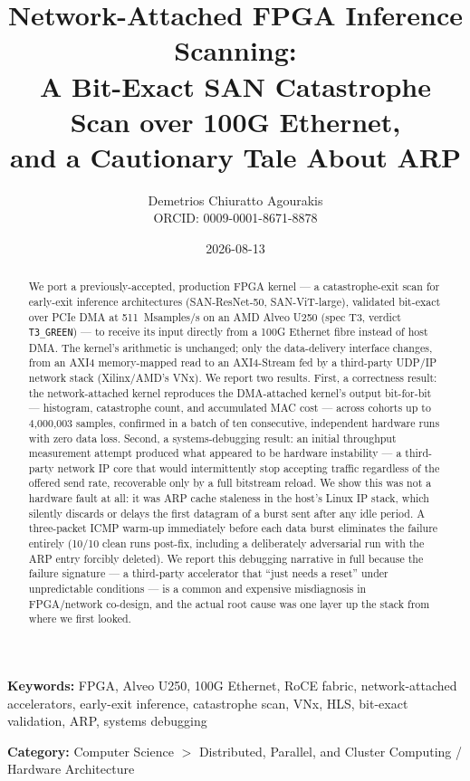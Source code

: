 \documentclass[11pt,a4paper]{article}
\title{\Large Network-Attached FPGA Inference Scanning: \\[4pt]
  A Bit-Exact SAN Catastrophe Scan over 100G Ethernet, \\[4pt]
  and a Cautionary Tale About ARP}
\author{
  Demetrios Chiuratto Agourakis\\
  \small ORCID: 0009-0001-8671-8878
}
\date{2026-08-13}
\newcommand{\code}[1]{\texttt{#1}}
\begin{document}
\maketitle

\begin{abstract}
We port a previously-accepted, production FPGA kernel --- a
catastrophe-exit scan for early-exit inference architectures
(SAN-ResNet-50, SAN-ViT-large), validated bit-exact over PCIe DMA at
511~Msamples/s on an AMD Alveo U250 (spec T3, verdict \code{T3\_GREEN})
--- to receive its input directly from a 100G Ethernet fibre instead of
host DMA. The kernel's arithmetic is unchanged; only the data-delivery
interface changes, from an AXI4 memory-mapped read to an AXI4-Stream fed
by a third-party UDP/IP network stack (Xilinx/AMD's VNx). We report two
results. First, a correctness result: the network-attached kernel
reproduces the DMA-attached kernel's output bit-for-bit --- histogram,
catastrophe count, and accumulated MAC cost --- across cohorts up to
4{,}000{,}003 samples, confirmed in a batch of ten consecutive,
independent hardware runs with zero data loss. Second, a
systems-debugging result: an initial throughput measurement attempt
produced what appeared to be hardware instability --- a third-party
network IP core that would intermittently stop accepting traffic
regardless of the offered send rate, recoverable only by a full bitstream
reload. We show this was not a hardware fault at all: it was ARP cache
staleness in the host's Linux IP stack, which silently discards or delays
the first datagram of a burst sent after any idle period. A three-packet
ICMP warm-up immediately before each data burst eliminates the failure
entirely (10/10 clean runs post-fix, including a deliberately adversarial
run with the ARP entry forcibly deleted). We report this debugging
narrative in full because the failure signature --- a third-party
accelerator that ``just needs a reset'' under unpredictable conditions
--- is a common and expensive misdiagnosis in FPGA/network co-design, and
the actual root cause was one layer up the stack from where we first
looked.
\end{abstract}

\noindent\textbf{Keywords:} FPGA, Alveo U250, 100G Ethernet, RoCE fabric,
network-attached accelerators, early-exit inference, catastrophe scan,
VNx, HLS, bit-exact validation, ARP, systems debugging

\bigskip
\noindent\textbf{Category:} Computer Science $>$ Distributed, Parallel,
and Cluster Computing / Hardware Architecture
\end{document}
